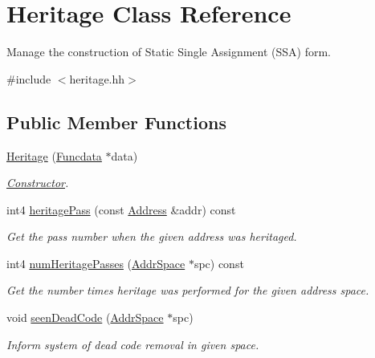 \hypertarget{class_heritage}{}\section{Heritage Class Reference}
\label{class_heritage}


Manage the construction of Static Single Assignment (S\+SA) form.  




{\ttfamily \#include $<$heritage.\+hh$>$}

\subsection*{Public Member Functions}
\begin{DoxyCompactItemize}
\item 
\mbox{\hyperlink{class_heritage_a9241f6a476085c88c540e34a44c5f197}{Heritage}} (\mbox{\hyperlink{class_funcdata}{Funcdata}} $\ast$data)
\begin{DoxyCompactList}\small\item\em \mbox{\hyperlink{class_constructor}{Constructor}}. \end{DoxyCompactList}\item 
int4 \mbox{\hyperlink{class_heritage_a0a0dc0ad60e23c2901675abf1e1371ac}{heritage\+Pass}} (const \mbox{\hyperlink{class_address}{Address}} \&addr) const
\begin{DoxyCompactList}\small\item\em Get the pass number when the given address was heritaged. \end{DoxyCompactList}\item 
int4 \mbox{\hyperlink{class_heritage_ad5576d24243e351ea478fe5b1174370b}{num\+Heritage\+Passes}} (\mbox{\hyperlink{class_addr_space}{Addr\+Space}} $\ast$spc) const
\begin{DoxyCompactList}\small\item\em Get the number times heritage was performed for the given address space. \end{DoxyCompactList}\item 
void \mbox{\hyperlink{class_heritage_abbcd7a583bd605db1177b9c2e0be599f}{seen\+Dead\+Code}} (\mbox{\hyperlink{class_addr_space}{Addr\+Space}} $\ast$spc)
\begin{DoxyCompactList}\small\item\em Inform system of dead code removal in given space. \end{DoxyCompactList}\item 

\end{DoxyCompactItemize}
